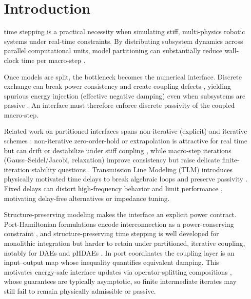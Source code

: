 \section{Introduction}
 time stepping is a practical necessity when simulating stiff, multi-physics robotic systems under real-time constraints. By distributing subsystem dynamics across parallel computational units, model partitioning can substantially reduce wall-clock time per macro-step \cite{negrut2014parallel, schweizer2015explicit}.

Once models are split, the bottleneck becomes the numerical interface. Discrete exchange can break power consistency and create coupling defects \cite{sadjina2024energy,sadjina2017energy,benedikt2013nepce}, yielding spurious energy injection (effective negative damping) even when subsystems are passive \cite{sadjina2024energy,gonzalez2019energy,rodriguez2022energy}. 
An interface must therefore enforce discrete passivity of the coupled macro-step.

Related work on partitioned interfaces spans non-iterative (explicit) and iterative schemes \cite{gomes2018co,blochwitz2011functional,schweizer2015explicit}: non-iterative zero-order-hold or extrapolation is attractive for real time but can drift or destabilize under stiff coupling \cite{peiret2018multibody,dai2023model,raoofian2024nonsmooth}, while macro-step iterations (Gauss--Seidel/Jacobi, relaxation) improve consistency \cite{dai2023model,raoofian2024nonsmooth} but raise delicate finite-iteration stability questions \cite{schweizer2016implicit}. 
Transmission Line Modeling (TLM) introduces physically motivated time delays to break algebraic loops and preserve passivity \cite{krus2011robust,braun2013multi,braun2022numerically}. Fixed delays can distort high-frequency behavior and limit performance \cite{barbierato2024locally,burton1993analysis,braun2024transmission}, motivating delay-free alternatives or impedance tuning.

Structure-preserving modeling makes the interface an explicit power contract. Port-Hamiltonian formulations encode interconnection as a power-conserving constraint \cite{celledoni2017energy,parks2017variational,ehrhardt2025structure}, and structure-preserving time stepping is well developed for monolithic integration \cite{celledoni2017energy,argus2021theory,ehrhardt2025structure} but harder to retain under partitioned, iterative coupling, notably for DAEs and pHDAEs \cite{bartel2023operator,ehrhardt2025structure}. In port coordinates the coupling layer is an input–output map whose inequality quantifies equivalent damping. This motivates energy-safe interface updates via operator-splitting compositions \cite{bartel2023operator,bartel2025splitting}, whose guarantees are typically asymptotic, so finite intermediate iterates may still fail to remain physically admissible or passive.


